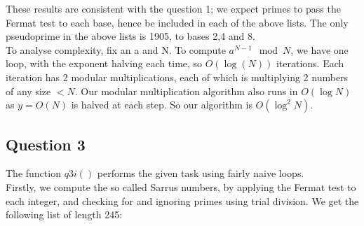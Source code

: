 \documentclass[10pt,a4paper]{report}
\begin{document}
These results are consistent with the question 1; we expect primes to pass the Fermat test to each base, hence be included in each of the above lists. The only pseudoprime in the above lists is 1905, to bases 2,4 and 8.\\


To analyse complexity, fix an a and N. To compute $a^{N-1}\mod N$, we have one loop, with the exponent halving each time, so $O(\log(N))$ iterations. Each iteration has 2 modular multiplications, each of which is multiplying 2 numbers of any size $<N$. Our modular multiplication algorithm also runs in $O(\log{N})$ as $y=O(N)$ is halved at each step. So our algorithm is $O(\log^2{N})$.



\subsection*{Question 3}

The function $q3i	()$ performs the given task using fairly naive loops.\\

Firstly, we compute the so called Sarrus numbers, by applying the Fermat test to each integer, and checking for and ignoring primes using trial division. We get the following list of length 245:
\end{document}
